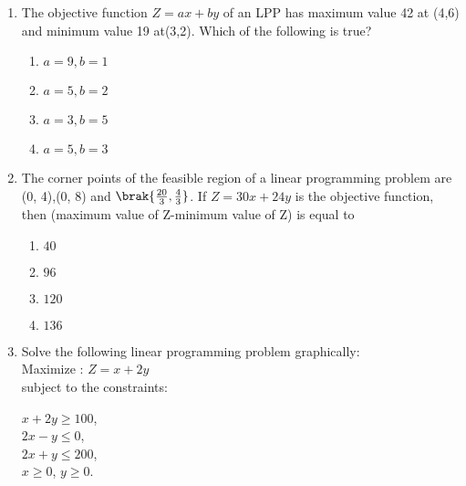 \begin{enumerate}
\item The objective function $Z=ax + by$ of an LPP has maximum value 42 at (4,6) and minimum value 19 at(3,2). Which of the following is true?
    \begin{enumerate}
        \item $ a=9,b=1 $
        \item $  a=5,b=2 $ 
        \item $  a=3,b=5 $ 
        \item $  a=5,b=3 $ 
    \end{enumerate}
    \item The corner points of the feasible region of a linear programming problem are (0, 4),(0, 8) and $\brak{\frac{20}{3},\frac{4}{3}}$. If $Z=30x+24y $ is the objective function, then (maximum value of Z-minimum value of Z) is equal to
    \begin{enumerate}
        \item $ 40 $
        \item $  96 $ 
        \item $  120 $ 
        \item $  136 $ 
    \end{enumerate}
     \item Solve the following linear programming problem graphically:\\
        Maximize : $Z = x + 2y$ \\
	subject to the constraints:\begin{center}
           $x + 2y \geq 100$, \\
	   $2x - y \leq 0$,\\
	   $2x +y \leq 200$,\\
	   $x \geq 0$, $y \geq 0$.
            \end{center}
\end{enumerate}
